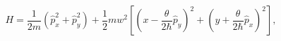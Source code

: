 \begin{equation}
H=\frac{1}{2m}\left(  \hat{p}_{x}^{2}+\hat{p}_{y}^{2}\right)  +\frac{1}%
{2}mw^{2}\left[  \left(  x-\frac{\theta}{2\hbar}\hat{p}_{y}\right)
^{2}+\left(  y+\frac{\theta}{2\hbar}\hat{p}_{x}\right)  ^{2}\right]
,\label{35}%
\end{equation}

